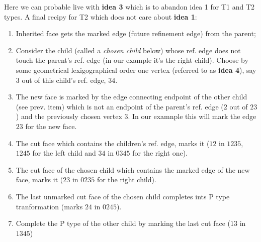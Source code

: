 \documentclass[a4paper,12pt]{amsart}
\numberwithin{equation}{section}
\begin{document}
\begin{itemize}
		Here we can probable live with \textbf{idea 3} which is to abandon idea 1 for T1 and T2 types.
		A final recipy for T2 which does not care about \textbf{idea 1}:
    	\begin{enumerate}
		\item Inherited face gets the marked edge (future refinement edge) from the parent;
		\item Consider the child (called a \textit{chosen child} below) whose ref. edge does not touch the parent's ref. edge (in our example it's the right child). Choose by some geometrical lexigographical order one vertex (referred to as \textbf{idea 4}), say $3$ out of this child's ref. edge, $34$.
		\item The new face is marked by the edge connecting endpoint of the other child (see prev. item) which is not an endpoint of the parent's ref. edge ($2$ out of $23$) and the previously chosen vertex $3$. In our examnple this will mark the edge $23$ for the new face.
		\item The cut face which contains the children's ref. edge, marks it ($12$ in $1235$, $1245$ for the left child and $34$ in $0345$ for the right one).
		\item The cut face of the chosen child which contains the marked edge of the new face, marks it ($23$ in $0235$ for the right child).
		\item The last unmarked cut face of the chosen child completes ints P type tranformation (marks $24$ in $0245$).
		\item Complete the P type of the other child by marking the last cut face ($13$ in $1345$)
		\end{enumerate}
		
	
	

	  \begin{minipage}[]{0.4\textwidth}
	  \begin{center}
\end{center}
\end{minipage}
\end{itemize}
\end{document}
